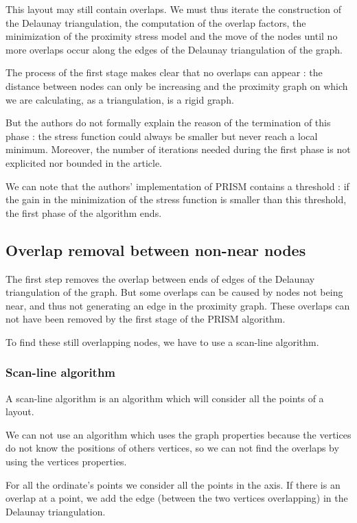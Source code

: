 \documentclass[12pt]{report}
\begin{document}
This layout may still contain overlaps. We must thus iterate the construction of the Delaunay triangulation, the computation of the overlap factors, the minimization of the proximity stress model and the move of the nodes until no more overlaps occur along the edges of the Delaunay triangulation of the graph.

\bigskip
The process of the first stage makes clear that no overlaps can appear : the distance between nodes can only be increasing and the proximity graph on which we are calculating, as a triangulation, is a rigid graph.

But the authors do not formally explain the reason of the termination of this phase : the stress function could always be smaller but never reach a local minimum. Moreover, the number of iterations needed during the first phase is not explicited nor bounded in the article.

We can note that the authors' implementation of PRISM contains a threshold : if the gain in the minimization of the stress function is smaller than this threshold, the first phase of the algorithm ends.


\subsection{Overlap removal between non-near nodes}

The first step removes the overlap between ends of edges of the Delaunay triangulation of the graph. But some overlaps can be caused by nodes not being near, and thus not generating an edge in the proximity graph. These overlaps can not have been removed by the first stage of the PRISM algorithm.

To find these still overlapping nodes, we have to use a scan-line algorithm.

\subsubsection{Scan-line algorithm}

A scan-line algorithm is an algorithm which will consider all the points of a layout.

We can not use an algorithm which uses the graph properties because the vertices do not know the positions of others vertices, so we can not find the overlaps by using the vertices properties.

For all the ordinate's points we consider all the points in the axis. If there is an overlap at a point, we add the edge (between the two vertices overlapping) in the Delaunay triangulation. 
\end{document}
